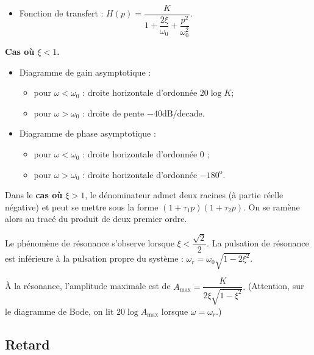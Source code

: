 \begin{resultat}
\begin{itemize}
\item Fonction de transfert : $H(p)=\dfrac{K}{1+\dfrac{2\xi}{\omega_0}+\dfrac{p^2}{\omega_0^2}}$.
\end{itemize}
\begin{center}
\textbf{Cas où $\xi<1$.}
\end{center}
\begin{itemize}
\item Diagramme de gain asymptotique : 
\begin{itemize}
\item pour $\omega<\omega_0$ : droite horizontale d'ordonnée $20 \log K$;
\item pour $\omega>\omega_0$ : droite de pente $-{40}\text{dB/decade}$.
\end{itemize}
\item Diagramme de phase asymptotique : 
\begin{itemize}
\item pour $\omega<\omega_0$ : droite horizontale d'ordonnée 0 \degre;
\item pour $\omega>\omega_0$ : droite horizontale d'ordonnée $-180^{\text{o}}$.
\end{itemize}
\end{itemize}


Dans le \textbf{cas où $\xi>1$}, le dénominateur admet deux racines (à partie réelle négative) et peut se mettre sous la forme  $\left(1+\tau_1 p \right)\left(1+\tau_2 p \right)$. On se ramène alors au tracé du produit de deux premier ordre.
\end{resultat}


\begin{resultat}

Le phénomène de résonance s'observe lorsque $\xi<\dfrac{\sqrt{2}}{2}$. La pulsation de résonance est inférieure à la pulsation propre du système :
$\omega_r = \omega_0\sqrt{1-2\xi^2}$.

\`A la résonance, l'amplitude maximale est de 
$A_{\text{max}} = \dfrac{K}{2\xi\sqrt{1-\xi^2}}.$
(Attention, sur le diagramme de Bode, on lit $20\log A_{\text{max}}$ lorsque $\omega=\omega_r$.)
\end{resultat}

\subsection{Retard}

